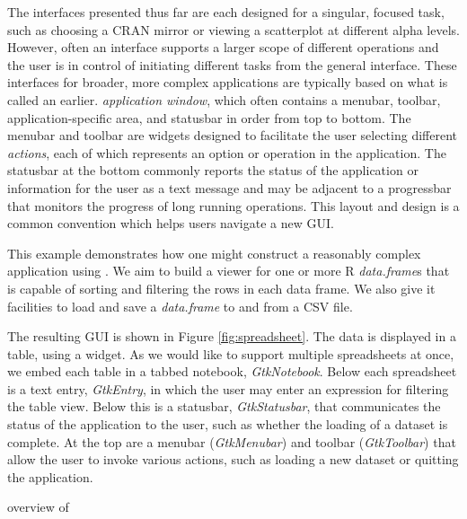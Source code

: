 \documentclass[article]{jss}
\begin{document}
The interfaces presented thus far are each designed for a singular,
focused task, such as choosing a CRAN mirror or viewing a scatterplot
at different alpha levels.  However, often an interface supports a
larger scope of different operations and the user is in control of
initiating different tasks from the general interface. These
interfaces for broader, more complex
applications are typically based on what is called an
earlier.
\emph{application window}, which often contains a menubar, toolbar,
application-specific area, and statusbar in order from top to
bottom. The menubar and toolbar are widgets designed to facilitate the
user selecting different \emph{actions}, each of which represents an
option or operation in the application.  The statusbar at the bottom
commonly reports the status of the application or information for the
user as a text message and may be adjacent to a progressbar that
monitors the progress of long running operations.  This layout and
design is a common convention which helps users navigate a new GUI.


This example demonstrates how one might construct a reasonably complex
application using . We aim to build a viewer for one or
more R \emph{data.frame}s that is capable of sorting and filtering the
rows in each data frame. We also give it facilities to load and save a
\emph{data.frame} to and from a CSV file. 

The resulting GUI is shown in Figure \ref{fig:spreadsheet}. The data
is displayed in a table, using a  widget. As we would
like to support multiple spreadsheets at once, we embed each table in
a tabbed notebook, \emph{GtkNotebook}. Below each spreadsheet is a
text entry, \emph{GtkEntry}, in which the user may enter an expression
for filtering the table view. Below this is a statusbar,
\emph{GtkStatusbar}, that communicates the status of the application
to the user, such as whether the loading of a dataset is complete. At
the top are a menubar (\emph{GtkMenubar}) and toolbar
(\emph{GtkToolbar}) that allow the user to invoke various actions,
such as loading a new dataset or quitting the application.

overview of

\end{document}
